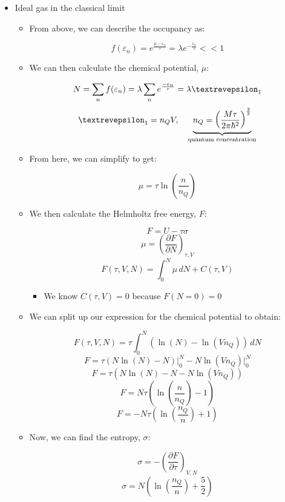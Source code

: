 \begin{itemize}
\begin{itemize}
    \end{itemize}

  \item Ideal gas in the classical limit

    \begin{itemize}

      \item From above, we can describe the occupancy as:

        $$f(\varepsilon_n)=e^{\frac{\mu-\varepsilon_n}{\tau}}=\lambda e^{-\frac{\varepsilon_n}{\tau}}<<1$$

      \item We can then calculate the chemical potential, $\mu$:

      $$N=\sum_nf(\varepsilon_n)=\lambda\sum_n e^{\frac{-\varepsilon_n}{\tau}}=\lambda \text{\textrevepsilon}_1$$
      $$\text{\textrevepsilon}_1=n_QV,\quad \underbrace{n_Q=\left( \frac{M\tau}{2\pi\hbar^2} \right)^{\frac{3}{2}}}_{\text{quantum concentration}}$$

    \item From here, we can simplify to get:

      $$\mu=\tau\ln\left( \frac{n}{n_Q} \right)$$

    \item We then calculate the Helmholtz free energy, $F$:

      $$F=U-\tau\sigma$$
      $$\mu=\left( \frac{\partial F}{\partial N} \right)_{\tau,V}$$
      $$F(\tau,V,N)=\int_0^N\mu\,dN+C(\tau,V)$$

      \begin{itemize}

        \item We know $C(\tau,V)=0$ because $F(N=0)=0$

      \end{itemize}

    \item We can split up our expression for the chemical potential to obtain:

      $$F(\tau,V,N)=\tau\int_0^N (\ln(N)-\ln(Vn_Q))\,dN$$
      $$F=\tau\left( N\ln(N)-N \right)\Big|_0^N-N\ln(Vn_Q)\Big|_0^N$$
      $$F=\tau\left( N\ln(N)-N-N\ln(Vn_Q) \right)$$
      $$F=N\tau\left(\ln(\frac{n}{n_Q})-1 \right)$$
      $$F=-N\tau\left(\ln(\frac{n_Q}{n})+1 \right)$$

    \item Now, we can find the entropy, $\sigma$:

      $$\sigma=-\left( \frac{\partial F}{\partial \tau} \right)_{V,N}$$
      $$\sigma=N\left( \ln\left( \frac{n_Q}{n} \right)+\frac{5}{2} \right)$$


\end{itemize}
\end{itemize}
